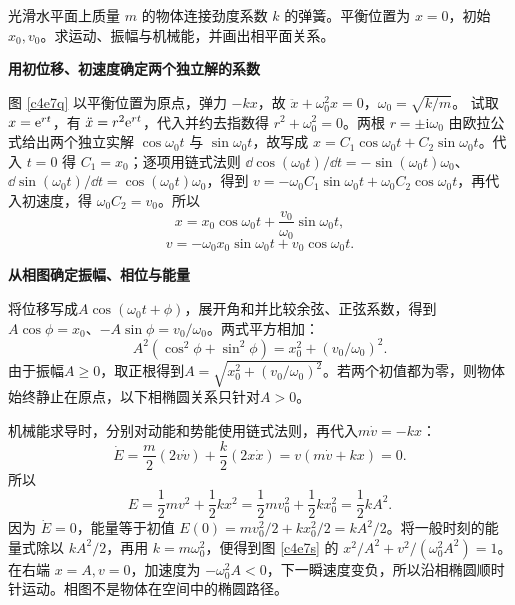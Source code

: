 \begin{question}
\begin{example}[弹簧振子的初值与能量]
光滑水平面上质量 $m$ 的物体连接劲度系数 $k$ 的弹簧。平衡位置为 $x=0$，初始 $x_0,v_0$。求运动、振幅与机械能，并画出相平面关系。
\end{example}
\end{question}
\begin{solution}\textbf{用初位移、初速度确定两个独立解的系数}\par\nobreak
图 \ref{c4e7q} 以平衡位置为原点，弹力 $-kx$，故
$\ddot x+\omega_0^2x=0$，$\omega_0=\sqrt{k/m}$。
试取 $x=\mathrm e^{rt}$，有 $\ddot x=r^2\mathrm e^{rt}$，代入并约去指数得 $r^2+\omega_0^2=0$。两根 $r=\pm\mathrm i\omega_0$ 由欧拉公式给出两个独立实解 $\cos\omega_0t$ 与 $\sin\omega_0t$，故写成 $x=C_1\cos\omega_0t+C_2\sin\omega_0t$。代入 $t=0$ 得 $C_1=x_0$；逐项用链式法则 $\dd\cos(\omega_0t)/\dd t=-\sin(\omega_0t)\omega_0$、$\dd\sin(\omega_0t)/\dd t=\cos(\omega_0t)\omega_0$，得到 $v=-\omega_0C_1\sin\omega_0t+\omega_0C_2\cos\omega_0t$，再代入初速度，得 $\omega_0C_2=v_0$。所以
\[
 \boxed{x=x_0\cos\omega_0t+\frac{v_0}{\omega_0}\sin\omega_0t},
\]
\[
 v=-\omega_0x_0\sin\omega_0t+v_0\cos\omega_0t.
\]



\par\medskip{}\noindent\textbf{从相图确定振幅、相位与能量}\par\nobreak
将位移写成$A\cos(\omega_0t+\phi)$，展开角和并比较余弦、正弦系数，得到$A\cos\phi=x_0$、$-A\sin\phi=v_0/\omega_0$。两式平方相加：
\[
A^2(\cos^2\phi+\sin^2\phi)=x_0^2+(v_0/\omega_0)^2.
\]
由于振幅$A\ge0$，取正根得到$A=\sqrt{x_0^2+(v_0/\omega_0)^2}$。若两个初值都为零，则物体始终静止在原点，以下相椭圆关系只针对$A>0$。

机械能求导时，分别对动能和势能使用链式法则，再代入$m\dot v=-kx$：
\[
\dot E=\frac m2(2v\dot v)+\frac k2(2x\dot x)
=v(m\dot v+kx)=0.
\]
所以
\[
 E=\frac12mv^2+\frac12kx^2
 =\frac12mv_0^2+\frac12kx_0^2=\frac12kA^2.
\]
因为 $\dot E=0$，能量等于初值
$E(0)=mv_0^2/2+kx_0^2/2=kA^2/2$。将一般时刻的能量式除以 $kA^2/2$，再用 $k=m\omega_0^2$，便得到图 \ref{c4e7s} 的 $x^2/A^2+v^2/(\omega_0^2A^2)=1$。在右端 $x=A,v=0$，加速度为 $-\omega_0^2A<0$，下一瞬速度变负，所以沿相椭圆顺时针运动。相图不是物体在空间中的椭圆路径。
\end{solution}

